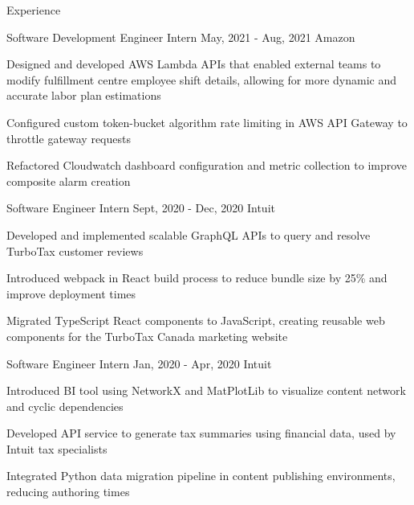 \documentclass{resume} %
\begin{document}
	\vspace{-0.5em}
	\begin{rSection}{Experience}

		\begin{rWorkSection}
			{Software Development Engineer Intern }
			{May, 2021 - Aug, 2021}
			{Amazon}
			{}
			{
				\item Designed and developed AWS Lambda APIs that enabled external teams to modify fulfillment centre employee shift details, allowing for more dynamic and accurate labor plan estimations
				\item Configured custom token-bucket algorithm rate limiting in AWS API Gateway to throttle gateway requests
				\item Refactored Cloudwatch dashboard configuration and metric collection to improve composite alarm creation
			}
		\end{rWorkSection}
		
		\begin{rWorkSection}
			{Software Engineer Intern}
			{Sept, 2020 - Dec, 2020}
			{Intuit}
			{}
			{
				\item Developed and implemented scalable GraphQL APIs to query and resolve TurboTax customer reviews
				\item Introduced webpack in React build process to reduce bundle size by 25{\%} and improve deployment times
				\item Migrated TypeScript React components to JavaScript, creating reusable web components for the TurboTax Canada marketing website
			}
		\end{rWorkSection}

		\begin{rWorkSection}
			{Software Engineer Intern}
			{Jan, 2020 - Apr, 2020}
			{Intuit}
			{}
			{
				\item Introduced BI tool using NetworkX and MatPlotLib to visualize content network and cyclic dependencies
				\item Developed API service to generate tax summaries using financial data, used by Intuit tax specialists
				\item Integrated Python data migration pipeline in content publishing environments, reducing authoring times
			}
		\end{rWorkSection}


\end{rSection}
\end{document}
